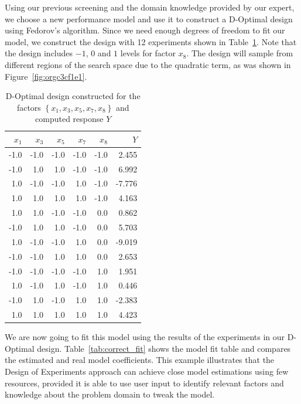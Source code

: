 \documentclass[conference]{IEEEtran}
\begin{document}
Using our previous screening and the domain knowledge provided by our expert, we
choose a new performance model and use it to construct a D-Optimal design using
Fedorov's algorithm. Since we need enough degrees of freedom to fit our model,
we construct the design with 12 experiments shown in Table~\ref{tab:d_optimal}.
Note that the design includes \(-1\), \(0\) and \(1\) levels for factor \(x_8\). The design
will sample from different regions of the search space due to the quadratic term,
as was shown in Figure~\ref{fig:orgc3cf1e1}.

\begin{table}[t]
\centering
\caption{D-Optimal design constructed for the factors $\left\{x_1,x_3,x_5,x_7,x_8\right\}$ and computed response $Y$}
\label{tab:d_optimal}
\begingroup\footnotesize
\begin{tabular}{rrrrrr}
  \toprule
$x_1$ & $x_3$ & $x_5$ & $x_7$ & $x_8$ & $Y$ \\
  \midrule
-1.0 & -1.0 & -1.0 & -1.0 & -1.0 & 2.455 \\
  -1.0 & 1.0 & 1.0 & -1.0 & -1.0 & 6.992 \\
  1.0 & -1.0 & -1.0 & 1.0 & -1.0 & -7.776 \\
  1.0 & 1.0 & 1.0 & 1.0 & -1.0 & 4.163 \\
  1.0 & 1.0 & -1.0 & -1.0 & 0.0 & 0.862 \\
  -1.0 & 1.0 & 1.0 & -1.0 & 0.0 & 5.703 \\
  1.0 & -1.0 & -1.0 & 1.0 & 0.0 & -9.019 \\
  -1.0 & -1.0 & 1.0 & 1.0 & 0.0 & 2.653 \\
  -1.0 & -1.0 & -1.0 & -1.0 & 1.0 & 1.951 \\
  1.0 & -1.0 & 1.0 & -1.0 & 1.0 & 0.446 \\
  -1.0 & 1.0 & -1.0 & 1.0 & 1.0 & -2.383 \\
  1.0 & 1.0 & 1.0 & 1.0 & 1.0 & 4.423 \\
   \bottomrule
\end{tabular}
\endgroup
\end{table}

We are now going to fit this model using the results of the experiments in our
D-Optimal design. Table~\ref{tab:correct_fit} shows the model fit table
and compares the estimated and real model coefficients. This example illustrates
that the Design of Experiments approach can achieve close model estimations
using few resources, provided it is able to use user input to identify relevant
factors and knowledge about the problem domain to tweak the model.
\end{document}
